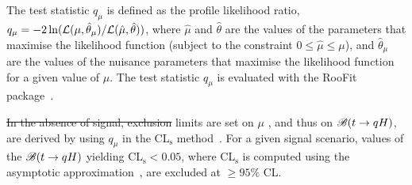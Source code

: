 \documentclass[PAPER, coverpage, atlasdraft=true, texlive=2016, UKenglish]{\ATLASLATEXPATH atlasdoc}
\providecommand{\DIFadd}[1]{{\protect\color{blue}\uwave{#1}}} %
\providecommand{\DIFdel}[1]{{\protect\color{red}\sout{#1}}}                      %
\providecommand{\DIFaddbegin}{} %
\providecommand{\DIFaddend}{} %
\providecommand{\DIFdelbegin}{} %
\providecommand{\DIFdelend}{} %
\begin{document}
The test statistic $q_\mu$ is defined as the profile likelihood ratio, 
$q_\mu = -2\ln({\cal L}(\mu,{\hat{\theta}}_\mu)/{\cal L}(\hat{\mu},\hat{\theta}))$,
where $\hat{\mu}$ and $\hat{\theta}$ are the values of the parameters that
maximise the likelihood function (subject to the constraint $0\leq \hat{\mu} \leq \mu$), and ${\hat{\theta}}_\mu$ are the values of the
nuisance parameters that maximise the likelihood function for a given value of $\mu$. 
The test statistic $q_\mu$ is evaluated with the {\textsc RooFit} package~\cite{Verkerke:2003ir,RooFitManual}.

\DIFdelbegin \DIFdel{In the absence of signal, exclusion }\DIFdelend %
\DIFaddbegin \DIFadd{Exclusion }\DIFaddend limits are set on $\mu$ , and thus on
$\mathscr{B}(t\to qH)$, are derived by using $q_\mu$ in the CL$_{\textrm{s}}$ method~\cite{Junk:1999kv,Read:2002hq}.
For a given signal scenario, values of the $\mathscr{B}(t\to qH)$ yielding CL$_{\textrm{s}} < 0.05$,
where CL$_{\textrm{s}}$ is computed using the asymptotic approximation~\cite{Cowan:2010js}, are excluded at $\geq 95\%$ CL.


\end{document}
